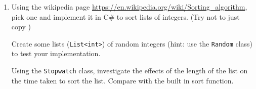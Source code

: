 \documentclass[a4paper]{article}
\begin{document}
\begin{enumerate}
	\item \label{itm:sort} Using the wikipedia page \url{https://en.wikipedia.org/wiki/Sorting_algorithm}, pick one and implement it in C\# to sort lists of integers. (Try not to just copy )

	Create some lists (\texttt{List<int>}) of random integers (hint: use the \texttt{Random} class) to test your implementation. 

	Using the \texttt{Stopwatch} class, investigate the effects of the length of the list on the time taken to sort the list. Compare with the built in sort function. 


\end{enumerate}
\end{document}
